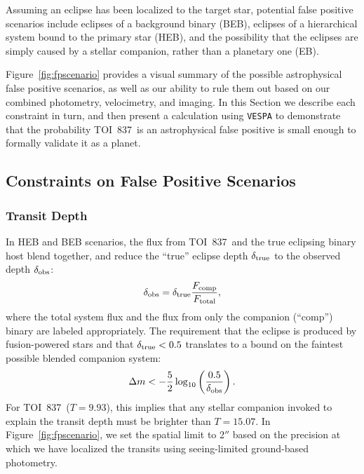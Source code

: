 \documentclass[12pt,twocolumn,tighten]{aastex63}
\newcommand{\tn}{TOI~837} %
\begin{document}
Assuming an eclipse has been localized to the target star, potential
false positive scenarios include eclipses of a background binary
(BEB), eclipses of a hierarchical system bound to the primary star
(HEB), and the possibility that the eclipses are simply caused by a
stellar companion, rather than a planetary one (EB).

Figure~\ref{fig:fpscenario} provides a visual summary of the possible
astrophysical false positive scenarios, as well as our ability to rule
them out based on our combined photometry, velocimetry, and imaging.
In this Section we describe each constraint in turn, and then present
a calculation using \texttt{VESPA} \citep{morton_efficient_2012} to
demonstrate that the probability \tn\ is an astrophysical false
positive is small enough to formally validate it as a planet.



\subsection{Constraints on False Positive Scenarios}
\label{subsec:fp_constraints}

\subsubsection{Transit Depth}
In HEB and BEB scenarios, the flux from \tn\ and the true eclipsing
binary host blend together, and reduce the ``true'' eclipse depth
$\delta_{\rm true}$ to the observed depth
$\delta_{\rm obs}$:
\begin{equation}
  \delta_{\rm obs}
  = 
  \delta_{\rm true} \frac{F_{\rm comp}}{F_{\rm total}},
\end{equation}
where the total system flux and the flux from only the companion
(``comp'') binary are labeled appropriately.  The requirement that the
eclipse is produced by fusion-powered stars and that $\delta_{\rm true} < 0.5$
translates to a bound on the faintest possible blended companion
system:
\begin{equation}
  \Delta m < -\frac{5}{2} \log_{10}
             \left( \frac{0.5}{\delta_{\rm obs}} \right).
\end{equation}
For \tn\ ($T=9.93$), this implies that any stellar companion invoked
to explain the transit depth must be brighter than $T=15.07$.  In
Figure~\ref{fig:fpscenario}, we set the spatial limit to 2$''$ based
on the precision at which we have localized the transits using
seeing-limited ground-based photometry.
\end{document}
